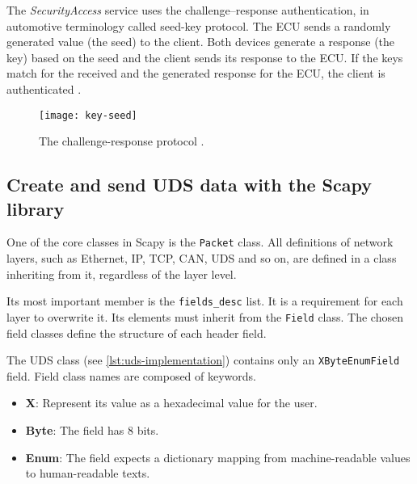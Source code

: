 The \emph{SecurityAccess} service uses the challenge–response authentication, in automotive terminology called seed-key protocol. The ECU sends a randomly generated value (the seed) to the client. Both devices generate a response (the key) based on the seed and the client sends its response to the ECU. If the keys match for the received and the generated response for the ECU, the client is authenticated \cite{iso14229}.

\begin{figure}[htb]
    \centering
    \texttt{[image: key-seed]}
    \caption{The challenge-response protocol \cite{Herrewegen2018}.}
    \label{fig:key-seed}
\end{figure}


\subsection{Create and send UDS data with the Scapy library}

One of the core classes in Scapy is the \texttt{Packet} class. All definitions of network layers, such as Ethernet, IP, TCP, CAN, UDS and so on, are defined in a class inheriting from it, regardless of the layer level.

Its most important member is the \texttt{fields_desc} list. It is a requirement for each layer to overwrite it. Its elements must inherit from the \texttt{Field} class. The chosen field classes define the structure of each header field.


The UDS class (see \autoref{lst:uds-implementation}) contains only an \texttt{XByteEnumField} field. Field class names are composed of keywords.
\begin{samepage}
\begin{itemize}
    \item \textbf{X}: Represent its value as a hexadecimal value for the user.
    \item \textbf{Byte}: The field has 8 bits.
    \item \textbf{Enum}: The field expects a dictionary mapping from machine-readable values to human-readable texts.
\end{itemize}
\end{samepage}

